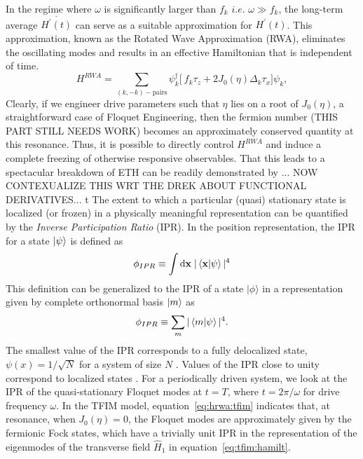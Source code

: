 \documentclass[%
reprint,
superscriptaddress,
amsmath,amssymb,
aps,
prb,
]{revtex4-2}
\begin{document}
	In the regime where $\omega$ is significantly larger than $f_k$ $i.e.$  $\omega \gg f_k$, the long-term average $\overline{H^\prime(t)}$ can serve as a suitable approximation for $H^\prime(t)$. This approximation, known as the Rotated Wave Approximation (RWA), eliminates the oscillating modes and results in an effective Hamiltonian that is independent of time.
	\begin{equation}
		\label{eq:hrwa:tfim}
		H^{RWA} = \sum_{(k,-k)-\mbox{pairs}} \psi^\dagger_k
		\bigg[\ f_k\tau_z + 2 J_0(\eta) \Delta_k\tau_x \bigg]\psi_k,
	\end{equation}
	Clearly, if we engineer drive parameters such that $\eta$ lies on a root of $J_0(\eta)$, a straightforward case of Floquet Engineering, then the fermion number (THIS PART STILL NEEDS WORK) becomes an approximately conserved quantity at this resonance. Thus, it is possible to directly control $H^{RWA}$ and induce a complete freezing of otherwise responsive observables. That this leads to a spectacular breakdown of ETH can be readily demonstrated by ... NOW CONTEXUALIZE THIS WRT THE DREK ABOUT FUNCTIONAL DERIVATIVES...
	t\q
	The extent to which a particular (quasi) stationary state is localized (or frozen) in a physically meaningful representation can be quantified by the \emph{Inverse Participation Ratio} (IPR). In the position representation, the IPR for a state $\ket{\psi}$  \cite{mukherjee_modulation-assisted_2015,lin_many-body_2018,murphy_generalized_2011, torres-herrera_self-averaging_2020} is defined as
	\begin{equation*}
		\phi_{IPR}\equiv \int \mathrm{d}\mathbf{x}\;\vert\ip{\mathbf{x}}{\psi}\vert^4
	\end{equation*}
	This definition can be generalized to the IPR of a state $|\phi\rangle$ in a representation given by complete orthonormal basis $\ket{m}$ as 
	\begin{equation}
	\label{eq:ipr:defn}
	\phi_{IPR} \equiv \sum_m\vert\ip{m}{\psi}\vert^4.
	\end{equation}
	The smallest value of the IPR corresponds to a fully delocalized state, $\psi(x)=1/\sqrt{N}$ for a system of size $N$ \cite{torres-herrera_self-averaging_2020,trivedi_can_2005}. Values of the IPR close to unity correspond to localized states \cite{misguich_inverse_2016}. For a periodically driven system, we look at the IPR of the quasi-stationary Floquet modes at $t=T$, where $t=2\pi/\omega$ for drive frequency $\omega$. In the TFIM model, equation~\ref{eq:hrwa:tfim} indicates that, at resonance, when $J_0(\eta)=0$, the Floquet modes are approximately given by the fermionic Fock states, which have a trivially unit IPR in the representation of the eigenmodes of the transverse field $\hat{H}_1$ in equation~\ref{eq:tfim:hamilt}.
		
\end{document}
